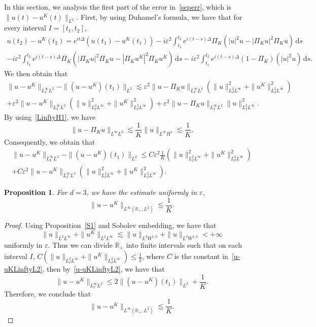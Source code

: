 \documentclass[10pt,a4paper]{article}
\newtheorem{proposition}[theorem]{Proposition}
\begin{document}
  In this section, we analysis the first part of the error in~\eqref{seperr}, which
  is \(\|u(t)-u^K(t)\|_{L^2}\). First, by using Duhamel's formula, we have
  that for every interval \(I = [t_1 , t_2]\),
  \begin{multline}
    u(t_2) - u^K(t_2) = e^{it\Delta}(u(t_1) - u^K(t_1))  
    - i \varepsilon^2 \int_{t_1}^{t_2} e^{i(t-s)\Delta} \Pi_K (|u|^2u 
    - |\Pi_K u|^2\Pi_K u) \,\mathrm{d}s \\ 
    - i \varepsilon^2 \int_{t_1}^{t_2} e^{i(t-s)\Delta} \Pi_K (|\Pi_K u|^2\Pi_K u 
    - |\Pi_K u^K|^2\Pi_K u^K) \,\mathrm{d}s  
    - i \varepsilon^2 \int_{t_1}^{t_2} e^{i(t-s)\Delta} (1 - \Pi_K)(|u|^2u) 
    \,\mathrm{d}s .
  \end{multline}
  We then obtain that
  \begin{multline}
    \|u-u^K\|_{L^{\infty}_{I}L^2} - \|(u-u^K)(t_1)\|_{L^2} \lesssim
    \varepsilon^2 \| u - \Pi_K u \|_{L^{\infty}_{I}L^2} ( \|u\|^2_{L^2_{I}L^{\infty}} + 
    \|u^K\|^2_{L^2_{I}L^{\infty}} ) \\
    + \varepsilon^2 \| u - u^K \|_{L^{\infty}_{I}L^2} ( \|u\|^2_{L^2_{I}L^{\infty}} + 
    \|u^K\|^2_{L^2_{I}L^{\infty}} ) + \varepsilon^2 \| u - \Pi_K u \|_{L^{\infty}_{I}L^2} 
    \|u\|^2_{L^2_{I}L^{\infty}}.
  \end{multline}
  By using~\eqref{LinftyH1}, we have 
  \[ \|u-\Pi_K u\|_{L^\infty L^2} \lesssim \frac1K \|u\|_{L^\infty H^1} \lesssim
  \frac1K. \]
  Consequently, we obtain that 
  \begin{multline}\label{u-uKLinftyL2}
    \|u-u^K\|_{L^\infty_I L^2} - \|(u-u^K)(t_1)\|_{L^2} \leq C
    \varepsilon^2 \frac1K (\|u\|^2_{L^2_I L^\infty} + 
    \|u^K\|^2_{L^2_I L^\infty} ) \\
    + C \varepsilon^2 \| u - u^K \|_{L^\infty_I L^2} ( \|u\|^2_{L^2_I L^\infty} + 
    \|u^K\|^2_{L^2_I L^\infty} ).
  \end{multline}


  \begin{proposition}\label{u-uKLinftyL2d3}
    For \(d=3\), we have the estimate uniformly in \(\varepsilon\),
    \begin{equation}
      \|u-u^K\|_{L^\infty({\mathbb R_+},L^2)} \lesssim \frac1K.
    \end{equation}
  \end{proposition}

  \begin{proof}
    Using Proposition~\ref{S1} and Sobolev embedding, we have that 
    \[ \|u\|_{L^2L^\infty}+\|u^K\|_{L^2L^\infty} \lesssim \|u\|_{L^2W^{1,6}} +
    \|u\|_{L^2W^{1,6}} < +\infty \]
    uniformly in \(\varepsilon\). Thus we can divide \(\mathbb R_+\) into finite 
    intervals such that on each interval \(I\), \(C (\|u\|_{L^2_I L^\infty} + 
    \|u^K\|_{L^2_I L^\infty}) \leq \frac12\), where \(C\) is the constant
    in~\eqref{u-uKLinftyL2}, then by~\eqref{u-uKLinftyL2}, we
    have that 
    \[ \|u-u^K\|_{L^\infty_I L^2} \leq 2\|(u-u^K)(t_1)\|_{L^2} + \frac1K. \]
    Therefore, we conclude that 
    \[ \|u-u^K\|_{L^\infty({\mathbb R_+},L^2)} \lesssim \frac1K. \]
  \end{proof}
\end{document}
